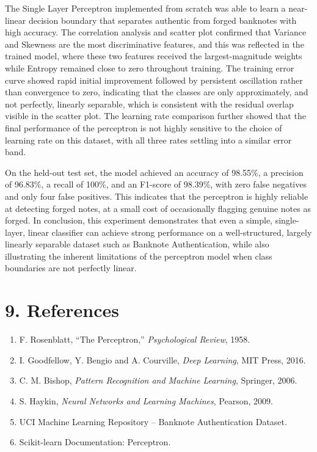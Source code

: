 \documentclass[11pt]{article}
\begin{document}
The Single Layer Perceptron implemented from scratch was able to learn a near-linear decision boundary that separates authentic from forged banknotes with high accuracy. The correlation analysis and scatter plot confirmed that Variance and Skewness are the most discriminative features, and this was reflected in the trained model, where these two features received the largest-magnitude weights while Entropy remained close to zero throughout training. The training error curve showed rapid initial improvement followed by persistent oscillation rather than convergence to zero, indicating that the classes are only approximately, and not perfectly, linearly separable, which is consistent with the residual overlap visible in the scatter plot. The learning rate comparison further showed that the final performance of the perceptron is not highly sensitive to the choice of learning rate on this dataset, with all three rates settling into a similar error band.

On the held-out test set, the model achieved an accuracy of 98.55\%, a precision of 96.83\%, a recall of 100\%, and an F1-score of 98.39\%, with zero false negatives and only four false positives. This indicates that the perceptron is highly reliable at detecting forged notes, at a small cost of occasionally flagging genuine notes as forged. In conclusion, this experiment demonstrates that even a simple, single-layer, linear classifier can achieve strong performance on a well-structured, largely linearly separable dataset such as Banknote Authentication, while also illustrating the inherent limitations of the perceptron model when class boundaries are not perfectly linear.


\section*{9. References}

\begin{enumerate}
\item F. Rosenblatt, ``The Perceptron,'' \emph{Psychological Review}, 1958.
\item I. Goodfellow, Y. Bengio and A. Courville, \emph{Deep Learning}, MIT Press, 2016.
\item C. M. Bishop, \emph{Pattern Recognition and Machine Learning}, Springer, 2006.
\item S. Haykin, \emph{Neural Networks and Learning Machines}, Pearson, 2009.
\item UCI Machine Learning Repository -- Banknote Authentication Dataset.
\item Scikit-learn Documentation: Perceptron.
\end{enumerate}
\end{document}
